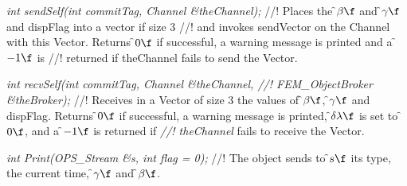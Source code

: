 {\em int sendSelf(int commitTag, Channel \&theChannel); } 
//! Places the \f$\beta\f$ and \f$\gamma\f$ and \p dispFlag into a vector if size 3
//! and invokes \p sendVector on the Channel with this Vector. Returns
\f$0\f$ if successful, a warning message is printed and a \f$-1\f$ is
//! returned if \p theChannel fails to send the Vector. 

{\em int recvSelf(int commitTag, Channel \&theChannel, 
//! FEM\_ObjectBroker \&theBroker); } 
//! Receives in a Vector of size 3 the values of \f$\beta\f$, \f$\gamma\f$ and
\p dispFlag. Returns \f$0\f$ if successful, a warning message is printed,
\f$\delta \lambda\f$ is set to \f$0\f$, and a \f$-1\f$ is returned if {\em
//! theChannel} fails to receive the Vector.

{\em int Print(OPS\_Stream \&s, int flag = 0);}
//! The object sends to \f$s\f$ its type, the current time, \f$\gamma\f$ and
\f$\beta\f$. 






